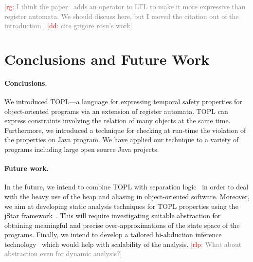 \documentclass{sigplanconf}[10pt] %
\newcommand{\noterg}[2]{\textcolor{gray}{[\textcolor{red}{#1}: #2]}}
\newcommand{\rg}[1]{\noterg{rg}{#1}}
\newcommand{\rlp}[1]{\noterg{rlp}{#1}}
\newcommand{\dd}[1]{\noterg{dd}{#1}}
\newcommand{\dinocomment}[1]{\dd{#1}}
\begin{document}
\rg{I think the paper~\cite{dblp:journals/tocl/demril09} adds an operator to LTL to make it more expressive than register automata.
We should discuss here, but I moved the citation out of the introduction.}
\dd{cite grigore rosu's work}
\section{Conclusions and Future Work}\label{sec:conclusions} %

\paragraph{Conclusions.}
We introduced TOPL---a language for expressing temporal safety properties for object-oriented programs via an extension of register automata.
TOPL can express constraints involving the relation of many objects at the same time.
Furthermore, we introduced a technique for checking at run-time the violation of the properties on Java program.
We have applied our technique to a variety of programs including large open source Java projects.
%
\paragraph{Future work.}
In the future, we intend to combine TOPL with  separation logic~\cite{reynolds2002} in order to deal with the heavy use of the heap and aliasing in object-oriented software.
Moreover, we aim at developing static analysis techniques for TOPL properties using the jStar framework~\cite{DBLP:conf/oopsla/DistefanoP08}.
This will require investigating suitable abstraction for obtaining meaningful and precise over-approximations of the state space of the programs.
Finally, we intend to develop a tailored bi-abduction inference technology~\cite{dblp:conf/popl/CalcagnoDOY09} which would help with scalability of the analysis.
\rlp{What about abstraction even for dynamic analysis?}


\end{document}
